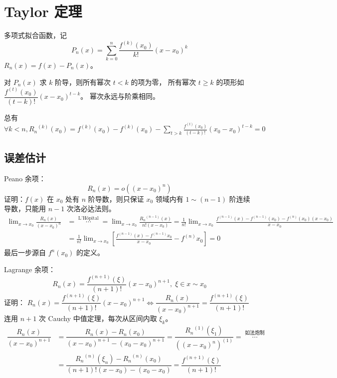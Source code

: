 \documentclass[12pt, a4paper, UTF8, openany]{ctexbook}
\newcommand{\difk}[2]{{#1}^{(#2)}}
\begin{document}
    \section{Taylor 定理}
    多项式拟合函数，记 $$P_n(x) = \sum_{k = 0}^{n} \frac{\difk{f}{k}(x_0)}{k!}(x - x_0)^k$$
    $R_n(x) = f(x) - P_n(x)$。

    对 $P_n(x)$ 求 $k$ 阶导，则所有幂次 $t < k$ 的项为零，
    所有幂次 $t \geqslant k$ 的项形如 $\dfrac{\difk{f}{t}(x_0)}{(t - k)!}(x - x_0)^{t - k}$。
    幂次永远与阶乘相同。

    总有 $\forall k < n, 
    \difk{R_n}{k}(x_0) = \difk{f}{k}(x_0) - \difk{f}{k}(x_0) 
    - \sum_{t > k}\frac{\difk{f}{t}(x_0)}{(t - k)!}(x_0 - x_0)^{t - k} = 0$
    
        \subsection{误差估计}
        Peano 余项：$$R_n(x) = o((x - x_0)^n)$$
        证明：$f(x)$ 在 $x_0$ 处有 $n$ 阶导数，则只保证 $x_0$ 领域内有 $1\sim(n - 1)$ 阶连续导数，只能用 $n - 1$ 次洛必达法则。 \\
        $\begin{aligned}
            \lim_{x \to x_0} \frac{R_n(x)}{(x - x_0)^n} &= \mathop{\cdots}\limits^{\text{L'Hôpital}} = 
            \lim_{x \to x_0} \frac{\difk{R_n}{n - 1}(x)}{n!(x - x_0)} 
            = \frac{1}{n!}\lim_{x \to x_0} \frac{\difk{f}{n - 1}(x) - \difk{f}{n - 1}(x_0) - \difk{f}{n}(x_0)(x - x_0)}{x - x_0} \\
            &= \frac{1}{n!} \lim_{x \to x_0} 
                \left[\frac{\difk{f}{n - 1}(x) - \difk{f}{n - 1}{x_0}}{x - x_0} - \difk{f}{n}{x_0}\right] = 0
        \end{aligned}$\\
        最后一步源自 $f^{n}(x_0)$ 的定义。

        Lagrange 余项：
        $$R_n(x) = \frac{\difk{f}{n + 1}(\xi)}{(n + 1)!}(x - x_0)^{n + 1}, \; \xi \in x \sim x_0$$
        证明：
        $R_n(x) = \dfrac{\difk{f}{n + 1}(\xi)}{(n + 1)!}(x - x_0)^{n + 1} 
        \iff \dfrac{R_n(x)}{(x - x_0)^{n + 1}} = \dfrac{\difk{f}{n + 1}(\xi)}{(n + 1)!}$ \\
        连用 $n + 1$ 次 Cauchy 中值定理，每次从区间内取 $\xi_k$。\\
        $\begin{aligned}
            \dfrac{R_n(x)}{(x - x_0)^{n + 1}} &= \dfrac{R_n(x) - R_n(x_0)}{(x - x_0)^{n + 1} - (x_0 - x_0)^{n + 1}} = 
            \dfrac{\difk{R_n}{1}(\xi_1)}{\difk{((x - x_0)^n)}{1}}
            = \mathop{\cdots}\limits^{\text{如法炮制}} \\
            &= \dfrac{\difk{R_n}{n}(\xi_n) - \difk{R_n}{n}(x_0)}{(n + 1)!(x - x_0) - (x_0 - x_0)} = 
            \dfrac{\difk{f}{n + 1}(\xi)}{(n + 1)!}
        \end{aligned}$
\end{document}
